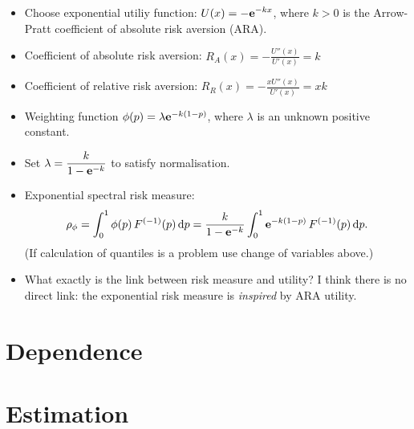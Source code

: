 \documentclass[square]{article} %
\theoremstyle{plain}
\theoremstyle{definition} %
\begin{document}
\begin{itemize}
\item Choose exponential utiliy function:
  $\displaystyle U(x) = -{\bf e}^{-k x}$, where $k>0$ is the Arrow-Pratt
  coefficient of absolute risk aversion
  (ARA).
\item Coefficient of absolute risk aversion: $\displaystyle R_A(x) =
  -\frac{U''(x)}{U'(x)} = k$
\item Coefficient of relative risk aversion: $\displaystyle R_R(x) = -
  \frac{x U''(x)}{U'(x)} = xk$
\item Weighting function $\phi(p) = \lambda {\bf e}^{-k(1-p)}$, where
  $\lambda$ is an unknown positive constant.
\item Set $\displaystyle\lambda = \frac{k}{1-{\bf e}^{-k}}$ to satisfy
  normalisation.
\item Exponential spectral risk measure:
  \begin{equation*}
    \rho_{\phi} = \int_0^1 \phi(p)\, F^{(-1)}(p)\, {\rm d} p =
    \frac{k}{1-{\bf e}^{-k}} \int_0^1 {\bf e}^{-k(1-p)}\, F^{(-1)}(p)\, {\rm d} p. 
  \end{equation*}
(If calculation of quantiles is a problem use change of variables
above.)
\item What exactly is the link between risk measure and utility?
    I think there is no direct link: the exponential risk measure is
   {\em inspired\/} by ARA utility.
\end{itemize}




\section{Dependence}
\label{sec:dependence}


\newpage
\section{Estimation}



\newpage
\end{document}
